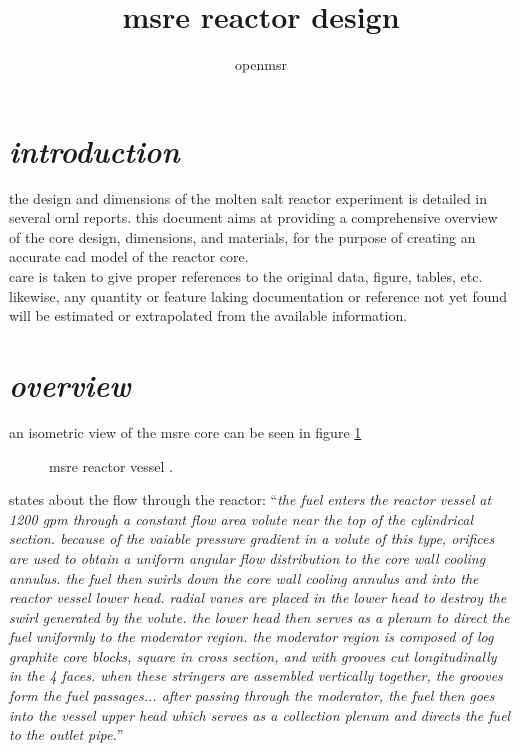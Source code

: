 \documentclass[ms,a4paper]{memoir}
\title{msre reactor design}
\author{openmsr}
\date{}
\newcommand*{\mrsarchive}{../../msr-archive}%
\begin{document}
\maketitle

\vspace{-4cm}
\renewcommand{\contentsname}{contents}
\tableofcontents*


\section{\emph{introduction}}
the design and dimensions of the molten salt reactor experiment is detailed in several ornl reports. this document aims at providing a comprehensive overview of the core design, dimensions, and materials, for the purpose of creating an accurate cad model of the reactor core. \\

care is taken to give proper references to the original data, figure, tables, etc. likewise, any quantity or feature laking documentation or reference not yet found will be estimated or extrapolated from the available information.



\section{\emph{overview}}
an isometric view of the msre core can be seen in figure \ref{3229-fig1}
\begin{figure}[H]
  \centering
  \caption{msre reactor vessel \parencite[figure 1]{ornl-tm-3229}.}
  \label{3229-fig1}
\end{figure}

\textcite[page 1]{ornl-tm-3229} states about the flow through the reactor:
\enquote{\textit{the fuel enters the reactor vessel at 1200 gpm through a constant flow area volute near the top of the cylindrical section. because of the vaiable pressure gradient in a volute of this type, orifices are used to obtain a uniform angular flow distribution to the core wall cooling annulus. the fuel then swirls down the core wall cooling annulus and into the reactor vessel lower head. radial vanes are placed in the lower head to destroy the swirl generated by the volute. the lower head then serves as a plenum to direct the fuel uniformly to the moderator region. the moderator region is composed of log graphite core blocks, square in cross section, and with grooves cut longitudinally in the 4 faces. when these stringers are assembled vertically together, the grooves form the fuel passages... after passing through the moderator, the fuel then goes into the vessel upper head which serves as a collection plenum and directs the fuel to the outlet pipe.}}
\end{document}
